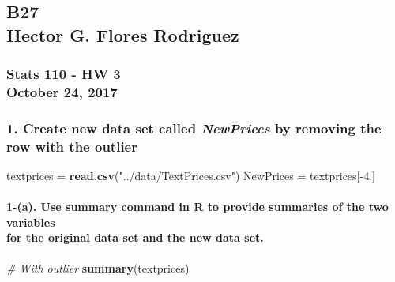 \documentclass[]{article}
\title{}
\author{}
\date{}
\newenvironment{Shaded}{\begin{snugshade}}{\end{snugshade}}
\newcommand{\KeywordTok}[1]{\textcolor[rgb]{0.13,0.29,0.53}{\textbf{{#1}}}}
\newcommand{\DecValTok}[1]{\textcolor[rgb]{0.00,0.00,0.81}{{#1}}}
\newcommand{\StringTok}[1]{\textcolor[rgb]{0.31,0.60,0.02}{{#1}}}
\newcommand{\CommentTok}[1]{\textcolor[rgb]{0.56,0.35,0.01}{\textit{{#1}}}}
\newcommand{\NormalTok}[1]{{#1}}
\let\oldparagraph\paragraph
\renewcommand{\paragraph}[1]{\oldparagraph{#1}\mbox{}}
\begin{document}
\subsection{\texorpdfstring{B27\\
Hector G. Flores
Rodriguez}{B27 Hector G. Flores Rodriguez}}\label{b27-hector-g.-flores-rodriguez}

\subsubsection{\texorpdfstring{Stats 110 - HW 3\\
October 24,
2017}{Stats 110 - HW 3 October 24, 2017}}\label{stats-110---hw-3-october-24-2017}

\subsubsection{\texorpdfstring{1. Create new data set called
\emph{NewPrices} by removing the row with the
outlier}{1. Create new data set called NewPrices by removing the row with the outlier}}\label{create-new-data-set-called-newprices-by-removing-the-row-with-the-outlier}

\begin{Shaded}
\begin{Highlighting}[]
\NormalTok{textprices =}\StringTok{ }\KeywordTok{read.csv}\NormalTok{(}\StringTok{"../data/TextPrices.csv"}\NormalTok{)}
\NormalTok{NewPrices =}\StringTok{ }\NormalTok{textprices[-}\DecValTok{4}\NormalTok{,]}
\end{Highlighting}
\end{Shaded}

\paragraph{\texorpdfstring{1-(a). Use summary command in R to provide
summaries of the two variables\\
for the original data set and the new data
set.}{1-(a). Use summary command in R to provide summaries of the two variables for the original data set and the new data set.}}\label{a.-use-summary-command-in-r-to-provide-summaries-of-the-two-variables-for-the-original-data-set-and-the-new-data-set.}

\begin{Shaded}
\begin{Highlighting}[]
\CommentTok{# With outlier}
\KeywordTok{summary}\NormalTok{(textprices)}
\end{Highlighting}
\end{Shaded}
\end{document}
